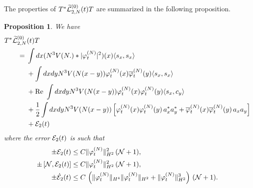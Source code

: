 \documentclass[11pt,a4paper]{article}
\newtheorem{proposition}[thm]{Proposition}
\newcommand{\wt}{\widetilde}
\newcommand{\cE}{{\cal E}}
\newcommand{\cL}{{\cal L}}
\newcommand{\cN}{{\cal N}}
\begin{document}
The properties of $T^* \wt{\cL}_{2,N}^{(0)} (t) T$ are summarized in the following proposition.
\begin{proposition}\label{prop:TwtL2T}
We have 
\begin{equation} \begin{split} 
T^* \wt{\cL}_{2,N}^{(0)} &(t) T \\ =\; & \int dx (N^3 V(N.) * |\varphi_t^{(N)}|^2) (x) \langle s_x , s_x \rangle \\ &+ \int dx dy N^3 V(N (x-y)) \varphi_t^{(N)} (x) \overline{\varphi}_t^{(N)} (y) \langle s_x , s_x \rangle \\ &+ \text{Re } \int dx dy N^3 V(N (x-y)) \varphi_t^{(N)} (x) \varphi_t^{(N)} (y) \langle s_x ,c_y \rangle \\ &+ \frac{1}{2} \int dx dy N^3 V(N (x-y)) \left[ \varphi_t^{(N)} (x) \varphi_t^{(N)} (y)\, a_x^* a_y^*  + \overline{\varphi}_t^{(N)} (x) \overline{\varphi}_t^{(N)} (y) \, a_x a_y \right]  \\ &+ \cE_2 (t) \end{split} \end{equation}
where the error $\cE_2 (t)$ is such that 
\begin{equation} \label{eq:T2T-cl}
\begin{split}
\pm  \cE_2 (t) &\leq C \| \varphi_t^{(N)} \|_{H^2}^2 \,  (\cN + 1), \\  \pm \left[ \cN , \cE_2 (t) \right]  &\leq C \| \varphi_t^{(N)} \|_{H^2}^2 \, (\cN + 1), \\ \pm \dot{\cE}_2 (t) &\leq C \, \left(\| \varphi_t^{(N)} \|_{H^4} \| \varphi_t^{(N)} \|_{H^2} +   \| \varphi_t^{(N)} \|_{H^2}^3 \right) \, (\cN+1) .
\end{split}
\end{equation} 
\end{proposition}
\end{document}
